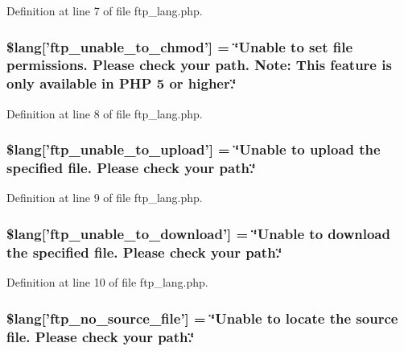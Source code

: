 Definition at line 7 of file ftp\-\_\-lang.\-php.

\hypertarget{ftp__lang_8php_a9ffd10144a0dfd5a3c7ab69e4edf1fdf}{
\subsubsection[{\$lang}]{\setlength{\rightskip}{0pt plus 5cm}\$lang\mbox{[}'ftp\-\_\-unable\-\_\-to\-\_\-chmod'\mbox{]} = \char`\"{}Unable {\bf to} set file permissions. Please check your path. Note\-: This feature is only available in P\-H\-P 5 {\bf or} higher.\char`\"{}}}\label{ftp__lang_8php_a9ffd10144a0dfd5a3c7ab69e4edf1fdf}


Definition at line 8 of file ftp\-\_\-lang.\-php.

\hypertarget{ftp__lang_8php_a1fd0c9f4e0f3be691a809ce804900ed7}{
\subsubsection[{\$lang}]{\setlength{\rightskip}{0pt plus 5cm}\$lang\mbox{[}'ftp\-\_\-unable\-\_\-to\-\_\-upload'\mbox{]} = \char`\"{}Unable {\bf to} upload the specified file. Please check your path.\char`\"{}}}\label{ftp__lang_8php_a1fd0c9f4e0f3be691a809ce804900ed7}


Definition at line 9 of file ftp\-\_\-lang.\-php.

\hypertarget{ftp__lang_8php_a65fa9f8b6a3da91390b36721c2a9775b}{
\subsubsection[{\$lang}]{\setlength{\rightskip}{0pt plus 5cm}\$lang\mbox{[}'ftp\-\_\-unable\-\_\-to\-\_\-download'\mbox{]} = \char`\"{}Unable {\bf to} download the specified file. Please check your path.\char`\"{}}}\label{ftp__lang_8php_a65fa9f8b6a3da91390b36721c2a9775b}


Definition at line 10 of file ftp\-\_\-lang.\-php.

\hypertarget{ftp__lang_8php_abf3e74ee1af13c9b0f0cc63fbb9081f1}{
\subsubsection[{\$lang}]{\setlength{\rightskip}{0pt plus 5cm}\$lang\mbox{[}'ftp\-\_\-no\-\_\-source\-\_\-file'\mbox{]} = \char`\"{}Unable {\bf to} locate the source file. Please check your path.\char`\"{}}}\label{ftp__lang_8php_abf3e74ee1af13c9b0f0cc63fbb9081f1}


